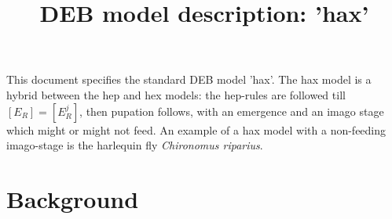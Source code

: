 \documentclass{article}
\title{DEB model description: 'hax'}
\begin{document}
\maketitle

This document specifies the standard DEB model 'hax'.
The hax model is a hybrid between the hep and hex models: the hep-rules are followed till $[E_R] = [E_R^j]$, then pupation follows, with an emergence and an imago stage which might or might not feed. 
An example of a hax model with a non-feeding imago-stage is the harlequin fly \emph{Chironomus riparius}.

\section{Background}







\end{document}
